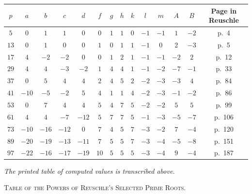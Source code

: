 \documentclass[11pt]{article}
\begin{document}
\begin{center}
\renewcommand{\arraystretch}{1.25}
\setlength{\tabcolsep}{4pt}
\begin{tabular}{|c|cccc|cccc|cc|cc|c|}
\hline
$p$ & $a$ & $b$ & $c$ & $d$ & $f$ & $g$ & $h$ & $k$ & $l$ & $m$ & $A$ & $B$ & Page in Reuschle \\
\hline
$5$  & $0$  & $1$  & $1$  & $0$  & $0$  & $1$  & $1$  & $0$  & $-1$ & $-1$ & $1$  & $-2$ & p.~4 \\
$13$ & $0$  & $1$  & $0$  & $0$  & $1$  & $0$  & $1$  & $1$  & $-1$ & $0$ & $2$  & $-3$ & p.~5 \\
$17$ & $4$  & $-2$ & $-2$ & $0$  & $0$  & $1$  & $2$  & $1$  & $-1$ & $-1$ & $-2$ & $2$  & p.~12 \\
$29$ & $4$  & $4$  & $-3$ & $-2$ & $1$  & $4$  & $4$  & $1$  & $-1$ & $-2$ & $-7$ & $-1$ & p.~33 \\
$37$ & $0$  & $5$  & $4$  & $4$  & $2$  & $4$  & $5$  & $2$  & $-2$ & $-3$ & $-3$ & $4$  & p.~84 \\
$41$ & $-10$& $-5$ & $-2$ & $5$  & $4$  & $1$  & $1$  & $4$  & $-2$ & $-3$ & $-1$ & $-2$ & p.~86 \\
$53$ & $0$  & $7$  & $4$  & $4$  & $5$  & $4$  & $7$  & $5$  & $-2$ & $-2$ & $5$  & $5$ & p.~99 \\
$61$ & $4$  & $4$  & $-7$ & $-12$& $5$  & $7$  & $7$  & $5$  & $-1$ & $-3$ & $-5$ & $-7$ & p.~106 \\
$73$ & $-10$& $-16$& $-12$& $0$  & $7$  & $4$  & $5$  & $7$  & $-3$ & $-2$ & $7$  & $-4$ & p.~120 \\
$89$ & $-20$& $-19$& $-13$& $-11$& $7$  & $5$  & $5$  & $7$  & $-3$ & $-4$ & $-5$ & $-8$ & p.~151 \\
$97$ & $-22$& $-16$& $-17$& $-19$& $10$ & $5$  & $5$  & $5$  & $-3$ & $-4$ & $9$  & $-4$ & p.~187 \\
\hline
\end{tabular}
\end{center}

\medskip

\noindent\textit{The printed table of computed values is transcribed above.}

\newpage

\begin{center}
\textsc{Table of the Powers of Reuschle's Selected Prime Roots.}
\end{center}
\end{document}
